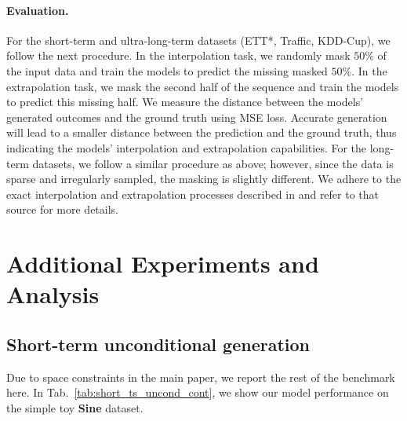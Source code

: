 \documentclass{article}
\begin{document}
\paragraph{Evaluation.} For the short-term and ultra-long-term datasets (ETT*, Traffic, KDD-Cup), we follow the next procedure. In the interpolation task, we randomly mask $50\%$ of the input data and train the models to predict the missing masked $50\%$. In the extrapolation task, we mask the second half of the sequence and train the models to predict this missing half. We measure the distance between the models' generated outcomes and the ground truth using MSE loss. Accurate generation will lead to a smaller distance between the prediction and the ground truth, thus indicating the models' interpolation and extrapolation capabilities. For the long-term datasets, we follow a similar procedure as above; however, since the data is sparse and irregularly sampled, the masking is slightly different. We adhere to the exact interpolation and extrapolation processes described in \cite{schirmer2022modeling} and refer to that source for more details.


\section{Additional Experiments and Analysis}

\subsection{Short-term unconditional generation}
\label{app:exp:short_term_unconditional_generation}

Due to space constraints in the main paper, we report the rest of the benchmark here. In Tab.~\ref{tab:short_ts_uncond_cont}, we show our model performance on the simple toy \textbf{Sine} dataset. 
\end{document}
